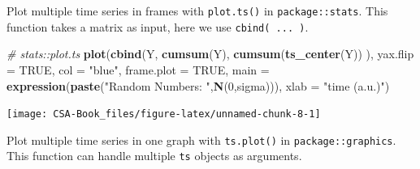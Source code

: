 \documentclass[12pt,]{book}
\newenvironment{Shaded}{\begin{snugshade}}{\end{snugshade}}
\newcommand{\CommentTok}[1]{\textcolor[rgb]{0.56,0.35,0.01}{\textit{#1}}}
\newcommand{\DataTypeTok}[1]{\textcolor[rgb]{0.13,0.29,0.53}{#1}}
\newcommand{\DecValTok}[1]{\textcolor[rgb]{0.00,0.00,0.81}{#1}}
\newcommand{\KeywordTok}[1]{\textcolor[rgb]{0.13,0.29,0.53}{\textbf{#1}}}
\newcommand{\NormalTok}[1]{#1}
\newcommand{\OtherTok}[1]{\textcolor[rgb]{0.56,0.35,0.01}{#1}}
\newcommand{\StringTok}[1]{\textcolor[rgb]{0.31,0.60,0.02}{#1}}
\begin{document}
Plot multiple time series in frames with \texttt{plot.ts()} in \texttt{package::stats}.
This function takes a matrix as input, here we use \texttt{cbind(\ ...\ )}.

\begin{Shaded}
\begin{Highlighting}[]
\CommentTok{# stats::plot.ts  }
\KeywordTok{plot}\NormalTok{(}\KeywordTok{cbind}\NormalTok{(Y,}
           \KeywordTok{cumsum}\NormalTok{(Y), }
           \KeywordTok{cumsum}\NormalTok{(}\KeywordTok{ts_center}\NormalTok{(Y))}
\NormalTok{           ), }
     \DataTypeTok{yax.flip =} \OtherTok{TRUE}\NormalTok{, }\DataTypeTok{col =} \StringTok{"blue"}\NormalTok{, }\DataTypeTok{frame.plot =} \OtherTok{TRUE}\NormalTok{, }
     \DataTypeTok{main =} \KeywordTok{expression}\NormalTok{(}\KeywordTok{paste}\NormalTok{(}\StringTok{"Random Numbers: "}\NormalTok{,}\KeywordTok{N}\NormalTok{(}\DecValTok{0}\NormalTok{,sigma))), }\DataTypeTok{xlab =} \StringTok{"time (a.u.)"}\NormalTok{)}
\end{Highlighting}
\end{Shaded}

\begin{center}\texttt{[image: CSA-Book\_files/figure-latex/unnamed-chunk-8-1]} \end{center}

Plot multiple time series in one graph with \texttt{ts.plot()} in \texttt{package::graphics}.
This function can handle multiple \texttt{ts} objects as arguments.
\end{document}
